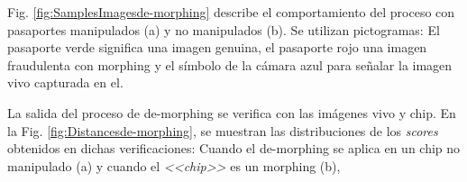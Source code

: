 Fig. \ref{fig:SamplesImagesde-morphing} describe el comportamiento del proceso con pasaportes manipulados (a) y no manipulados (b). Se utilizan pictogramas: El pasaporte verde significa una imagen genuina, el pasaporte rojo una imagen fraudulenta con \gls{morphing} y el símbolo de la cámara azul para señalar la imagen \gls{vivo} capturada en el.


\color{cyan}



\color{black}

La salida del proceso de \gls{de-morphing} se verifica con las imágenes \gls{vivo} y \gls{chip}. En la Fig. \ref{fig:Distancesde-morphing}, se muestran las distribuciones de los \textit{scores} obtenidos en dichas verificaciones: Cuando el \gls{de-morphing} se aplica en un \gls{chip} no manipulado (a) y cuando el \textit{<<\gls{chip}>>} es un \gls{morphing} (b),  

